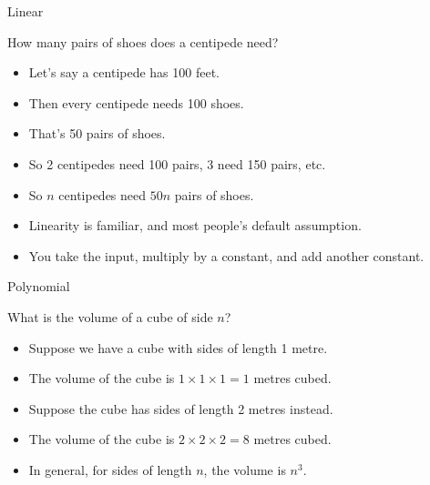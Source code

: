 \documentclass{beamer}
\begin{document}
  
\begin{frame}{Linear}
  \begin{exampleblock}{How many pairs of shoes does a centipede need?}
    \begin{itemize}
      \item Let's say a centipede has 100 feet.
      \item Then every centipede needs 100 shoes.
      \item That's 50 pairs of shoes.
      \item So 2 centipedes need 100 pairs, 3 need 150 pairs, etc.
      \item So $n$ centipedes need $50n$ pairs of shoes.
      \item Linearity is familiar, and most people's default assumption.
      \item You take the input, multiply by a constant, and add another constant.
    \end{itemize}
  \end{exampleblock}
\end{frame}
  
  
\begin{frame}{Polynomial}
  \begin{exampleblock}{What is the volume of a cube of side $n$?}
    \begin{itemize}
      \item Suppose we have a cube with sides of length 1 metre.
      \item The volume of the cube is $1 \times 1 \times 1 = 1$ metres cubed.
      \item Suppose the cube has sides of length 2 metres instead.
      \item The volume of the cube is $2 \times 2 \times 2 = 8$ metres cubed.
      \item In general, for sides of length $n$, the volume is $n^3$.
    \end{itemize}
  \end{exampleblock}
\end{frame}
  
\end{document}
